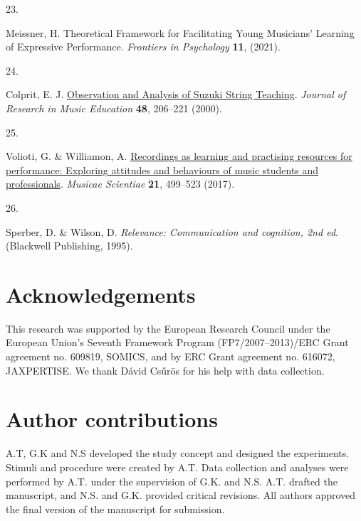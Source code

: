 \documentclass[
  man,floatsintext]{apa6}
\newlength{\cslhangindent}
\newlength{\csllabelwidth}
\newlength{\cslentryspacingunit} %
\newenvironment{CSLReferences}[2] %
 {%
  \setlength{\parindent}{0pt}
  \ifodd #1
  \let\oldpar\par
  \def\par{\hangindent=\cslhangindent\oldpar}
  \fi
  \setlength{\parskip}{#2\cslentryspacingunit}
 }%
 {}
\newcommand{\CSLLeftMargin}[1]{\parbox[t]{\csllabelwidth}{#1}}
\newcommand{\CSLRightInline}[1]{\parbox[t]{\linewidth - \csllabelwidth}{#1}\break}
\begin{document}
\begin{CSLReferences}{0}{0}
\leavevmode{}%
\CSLLeftMargin{23. }%
\CSLRightInline{Meissner, H. Theoretical {Framework} for {Facilitating Young Musicians}' {Learning} of {Expressive Performance}. \emph{Frontiers in Psychology} \textbf{11}, (2021).}

\leavevmode{}%
\CSLLeftMargin{24. }%
\CSLRightInline{Colprit, E. J. \href{https://doi.org/10.2307/3345394}{Observation and {Analysis} of {Suzuki String Teaching}}. \emph{Journal of Research in Music Education} \textbf{48}, 206--221 (2000).}

\leavevmode{}%
\CSLLeftMargin{25. }%
\CSLRightInline{Volioti, G. \& Williamon, A. \href{https://doi.org/10.1177/1029864916674048}{Recordings as learning and practising resources for performance: {Exploring} attitudes and behaviours of music students and professionals}. \emph{Musicae Scientiae} \textbf{21}, 499--523 (2017).}

\leavevmode{}%
\CSLLeftMargin{26. }%
\CSLRightInline{Sperber, D. \& Wilson, D. \emph{Relevance: {Communication} and cognition, 2nd ed}. ({Blackwell Publishing}, 1995).}

\end{CSLReferences}

\endgroup

\hypertarget{acknowledgements}{%
\section{Acknowledgements}\label{acknowledgements}}

This research was supported by the European Research Council under the European Union's Seventh Framework Program (FP7/2007--2013)/ERC Grant agreement no. 609819, SOMICS, and by ERC Grant agreement no. 616072, JAXPERTISE. We thank Dávid Csűrös for his help with data collection.

\hypertarget{author-contributions}{%
\section{Author contributions}\label{author-contributions}}

A.T, G.K and N.S developed the study concept and designed the experiments. Stimuli and procedure were created by A.T. Data collection and analyses were performed by A.T. under the supervision of G.K. and N.S. A.T. drafted the manuscript, and N.S. and G.K. provided critical revisions. All authors approved the final version of the manuscript for submission.
\end{document}
